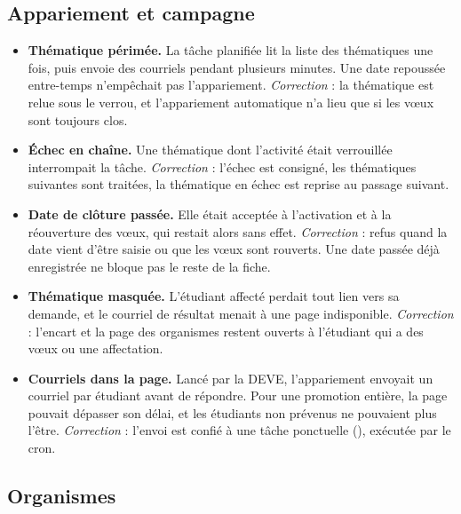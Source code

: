 \documentclass[11pt,a4paper]{article}
\newcommand{\grav}[1]{\textbf{\textcolor{#1}{\textbullet}}}
\newcommand{\mineure}{\grav{gray}}
\begin{document}
\subsection{Appariement et campagne}

\begin{itemize}
  \item[\mineure] \textbf{Thématique périmée.} La tâche planifiée lit la liste des thématiques une
    fois, puis envoie des courriels pendant plusieurs minutes. Une date repoussée entre-temps
    n'empêchait pas l'appariement. \emph{Correction} : la thématique est relue sous le verrou, et
    l'appariement automatique n'a lieu que si les vœux sont toujours clos.
  \item[\mineure] \textbf{Échec en chaîne.} Une thématique dont l'activité était verrouillée
    interrompait la tâche. \emph{Correction} : l'échec est consigné, les thématiques suivantes
    sont traitées, la thématique en échec est reprise au passage suivant.
  \item[\mineure] \textbf{Date de clôture passée.} Elle était acceptée à l'activation et à la
    réouverture des vœux, qui restait alors sans effet. \emph{Correction} : refus quand la date
    vient d'être saisie ou que les vœux sont rouverts. Une date passée déjà enregistrée ne bloque
    pas le reste de la fiche.
  \item[\mineure] \textbf{Thématique masquée.} L'étudiant affecté perdait tout lien vers sa
    demande, et le courriel de résultat menait à une page indisponible. \emph{Correction} :
    l'encart et la page des organismes restent ouverts à l'étudiant qui a des vœux ou une
    affectation.
  \item[\mineure] \textbf{Courriels dans la page.} Lancé par la DEVE, l'appariement envoyait un
    courriel par étudiant avant de répondre. Pour une promotion entière, la page pouvait dépasser
    son délai, et les étudiants non prévenus ne pouvaient plus l'être. \emph{Correction} : l'envoi
    est confié à une tâche ponctuelle (), exécutée par le cron.
\end{itemize}

\subsection{Organismes}
\end{document}
